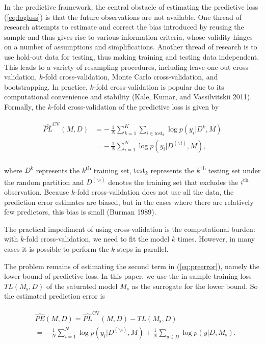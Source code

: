 \documentclass[11pt,article,oneside]{memoir}
\begin{document}
In the predictive framework, the central obstacle of estimating the
predictive loss (\ref{eq:logloss}) is that the future observations are
not available. One thread of research attempts to estimate and correct
the bias introduced by reusing the sample and thus gives rise to various
information criteria, whose validity hinges on a number of assumptions
and simplifications. Another thread of research is to use hold-out data
for testing, thus making training and testing data independent. This
leads to a variety of resampling procedures, including leave-one-out
cross-validation, \(k\)-fold cross-validation, Monte Carlo
cross-validation, and bootstrapping. In practice, \(k\)-fold
cross-validation is popular due to its computational convenience and
stability (Kale, Kumar, and Vassilvitskii 2011). Formally, the
\(k\)-fold cross-validation of the predictive loss is given by

\begin{align}
\begin{split}
  \label{eq:xvalesti}
  \widehat{PL}^{\text{CV}}(M, D) &=-\,\frac{1}{N}\sum_{k=1}^K\sum_{i\in
    \text{test}_k}\log p(y_i|D^k, M)\\
  &=-\,\frac{1}{N}\sum_{i=1}^N\log
  p(y_i|D^{(\backslash i)}, M),
\end{split}
\end{align}

\noindent where \(D^k\) represents the \(k\)\textsuperscript{th}
training set, \(\text{test}_k\) represents the \(k\)\textsuperscript{th}
testing set under the random partition and \(D^{(\backslash i)}\)
denotes the training set that excludes the \(i\)\textsuperscript{th}
observation. Because \(k\)-fold cross-validation does not use all the
data, the prediction error estimates are biased, but in the cases where
there are relatively few predictors, this bias is small (Burman 1989).

The practical impediment of using cross-validation is the computational
burden: with \(k\)-fold cross-validation, we need to fit the model \(k\)
times. However, in many cases it is possible to perform the \(k\) steps
in parallel.

The problem remains of estimating the second term in
(\ref{eq:preerror}), namely the lower bound of predictive loss. In this
paper, we use the in-sample training loss \(TL(M_{\text{s}}, D)\) of the
saturated model \(M_s\) as the surrogate for the lower bound. So the
estimated prediction error is

\begin{align}
\begin{split}
  \label{eq:esti_preerror}
  &\widehat{PE}(M, D)=\widehat{PL}^{\text{CV}}(M,D)-TL(M_{\text{s}},D)\\
  &= -\,\frac{1}{N}\sum_{i=1}^N\log p(y_i|D^{(\backslash i)},
  M)+\frac{1}{N}\sum_{y\in D}\log p(y | D, M_{\text{s}}).
\end{split}
\end{align}
\end{document}
